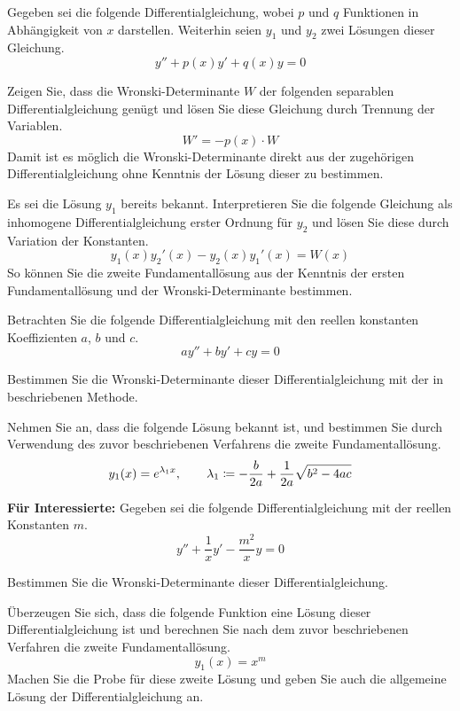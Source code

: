\begin{atiTask}[
	title = Die Wronski-Determinante
]
	Gegeben sei die folgende Differentialgleichung, wobei $p$ und $q$ Funktionen in Abhängigkeit von $x$ darstellen.
	Weiterhin seien $y_1$ und $y_2$ zwei Lösungen dieser Gleichung.
	\[
		y'' + p(x)y' + q(x)y = 0
	\]
	\begin{atiSubtasks}
		\item{
			Zeigen Sie, dass die Wronski-Determinante $W$ der folgenden separablen Differentialgleichung genügt und lösen Sie diese Gleichung durch Trennung der Variablen.
			\[
				W' = -p(x)\cdot W
			\]
			Damit ist es möglich die Wronski-Determinante direkt aus der zugehörigen Differentialgleichung ohne Kenntnis der Lösung dieser zu bestimmen.
		}
		\item{
			Es sei die Lösung $y_1$ bereits bekannt.
			Interpretieren Sie die folgende Gleichung als inhomogene Differentialgleichung erster Ordnung für $y_2$ und lösen Sie diese durch Variation der Konstanten.
			\[
				y_1(x)y_2'(x)-y_2(x)y_1'(x) = W(x)
			\]
			So können Sie die zweite Fundamentallösung aus der Kenntnis der ersten Fundamentallösung und der Wronski-Determinante bestimmen.
		}
		\item{
			Betrachten Sie die folgende Differentialgleichung mit den reellen konstanten Koeffizienten $a$, $b$ und $c$.
			\[
				ay'' + by' + cy = 0
			\]
			\begin{atiSubsubtasks}
				\item{
					Bestimmen Sie die Wronski-Determinante dieser Differentialgleichung mit der in  beschriebenen Methode.
				}
				\item{
					Nehmen Sie an, dass die folgende Lösung bekannt ist, und bestimmen Sie durch Verwendung des zuvor beschriebenen Verfahrens die zweite Fundamentallösung.
					\[
						y_1(x) = e^{\lambda_1 x}
						,\qquad
						\lambda_1 \coloneqq -\frac{b}{2a} + \frac{1}{2a}\sqrt{b^2-4ac}
					\]
				}
			\end{atiSubsubtasks}
		}
		\item{
			\textbf{Für Interessierte:}
			Gegeben sei die folgende Differentialgleichung mit der reellen Konstanten $m$.
			\[
				y'' + \frac{1}{x} y' - \frac{m^2}{x}y = 0
			\]
			\begin{atiSubsubtasks}
				\item{
					Bestimmen Sie die Wronski-Determinante dieser Differentialgleichung.
				}
				\item{
					Überzeugen Sie sich, dass die folgende Funktion eine Lösung dieser Differentialgleichung ist und berechnen Sie nach dem zuvor beschriebenen Verfahren die zweite Fundamentallösung.
					\[
						y_1(x) = x^m
					\]
					Machen Sie die Probe für diese zweite Lösung und geben Sie auch die allgemeine Lösung der Differentialgleichung an.
				}
			\end{atiSubsubtasks}
		}
	\end{atiSubtasks}
\end{atiTask}